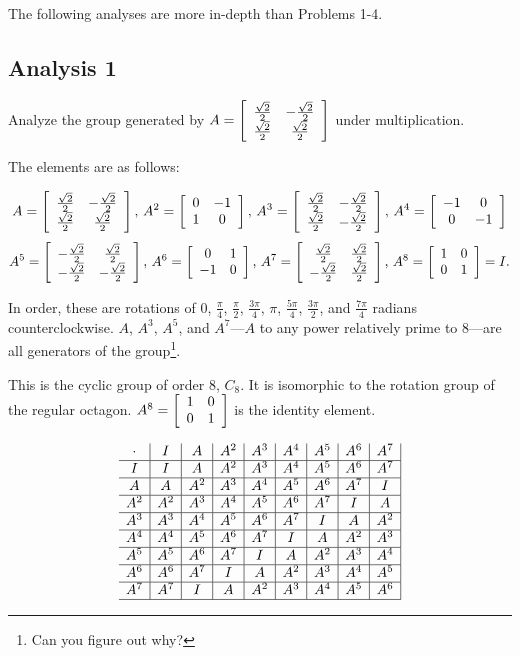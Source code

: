 \documentclass[../gatm.tex]{subfiles}
\begin{document}
The following analyses are more in-depth than Problems 1-4.

\subsection*{Analysis 1}

Analyze the group generated by $A=\left[\begin{array}{cc} \frac{\sqrt{2}}{2} & -\frac{\sqrt{2}}{2} \\ \frac{\sqrt{2}}{2} & \frac{\sqrt{2}}{2} \end{array}\right]$ under multiplication.

The elements are as follows:

$$A= \left[\begin{array}{cc} \frac{\sqrt{2}}{2} & -\frac{\sqrt{2}}{2} \\ \frac{\sqrt{2}}{2} & \frac{\sqrt{2}}{2} \end{array}\right],\, 
A^2 = \left[\begin{array}{cc} 0 & -1 \\ 1 & 0 \end{array}\right],\, 
A^3 = \left[\begin{array}{cc} \frac{\sqrt{2}}{2} & -\frac{\sqrt{2}}{2} \\ \frac{\sqrt{2}}{2} & -\frac{\sqrt{2}}{2} \end{array}\right],\, 
A^4 = \left[\begin{array}{cc} -1 & 0 \\ 0 & -1 \end{array}\right]$$
$$A^5 = \left[\begin{array}{cc} -\frac{\sqrt{2}}{2} & \frac{\sqrt{2}}{2} \\ -\frac{\sqrt{2}}{2} & -\frac{\sqrt{2}}{2} \end{array}\right],\, 
A^6 = \left[\begin{array}{cc} 0 & 1 \\ -1 & 0 \end{array}\right],\, 
A^7 = \left[\begin{array}{cc} \frac{\sqrt{2}}{2} & \frac{\sqrt{2}}{2} \\ -\frac{\sqrt{2}}{2} & \frac{\sqrt{2}}{2} \end{array}\right],\, 
A^8 = \left[\begin{array}{cc} 1 & 0 \\ 0 & 1 \end{array}\right] = I.$$

In order, these are rotations of $0$, $\frac{\pi}{4}$, $\frac{\pi}{2}$, $\frac{3\pi}{4}$, $\pi$, $\frac{5\pi}{4}$, $\frac{3\pi}{2}$, and $\frac{7\pi}{4}$ radians counterclockwise. $A$, $A^3$, $A^5$, and $A^7$---$A$ to any power relatively prime to $8$---are all generators of the group\footnote{Can you figure out why?}.

This is the cyclic group of order $8$, $C_8$. It is isomorphic to the rotation group of the regular octagon. $A^8=\left[\begin{array}{cc} 1 & 0 \\ 0 & 1 \end{array}\right]$ is the identity element. 

$$\begin{array}{c|c|c|c|c|c|c|c|c|}
\cdot & I & A & A^2 & A^3 & A^4 & A^5 & A^6 & A^7 \\ \hline
I & I & A & A^2 & A^3 & A^4 & A^5 & A^6 & A^7 \\ \hline
A & A & A^2 & A^3 & A^4 & A^5 & A^6 & A^7 & I \\ \hline
A^2 & A^2 & A^3 & A^4 & A^5 & A^6 & A^7 & I & A \\ \hline
A^3 & A^3 & A^4 & A^5 & A^6 & A^7 & I & A & A^2 \\ \hline
A^4 & A^4 & A^5 & A^6 & A^7 & I & A & A^2 & A^3 \\ \hline
A^5 & A^5 & A^6 & A^7 & I & A & A^2 & A^3 & A^4 \\ \hline
A^6 & A^6 & A^7 & I & A & A^2 & A^3 & A^4 & A^5 \\ \hline
A^7 & A^7 & I & A & A^2 & A^3 & A^4 & A^5 & A^6 \\ \hline
\end{array}$$
\end{document}
